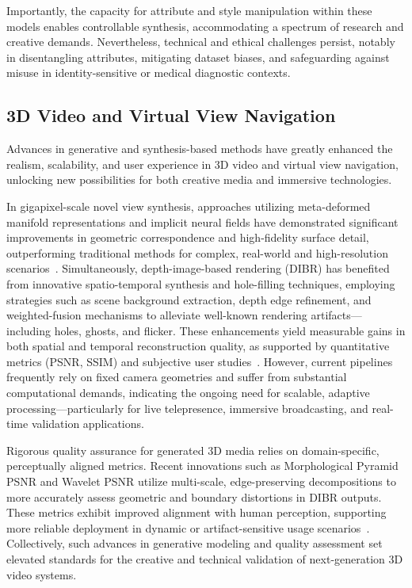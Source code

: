 \documentclass[sigconf]{acmart}
\begin{document}
Importantly, the capacity for attribute and style manipulation within these models enables controllable synthesis, accommodating a spectrum of research and creative demands. Nevertheless, technical and ethical challenges persist, notably in disentangling attributes, mitigating dataset biases, and safeguarding against misuse in identity-sensitive or medical diagnostic contexts.

\subsection{3D Video and Virtual View Navigation}

Advances in generative and synthesis-based methods have greatly enhanced the realism, scalability, and user experience in 3D video and virtual view navigation, unlocking new possibilities for both creative media and immersive technologies.

In gigapixel-scale novel view synthesis, approaches utilizing meta-deformed manifold representations and implicit neural fields have demonstrated significant improvements in geometric correspondence and high-fidelity surface detail, outperforming traditional methods for complex, real-world and high-resolution scenarios~\cite{ref98}. Simultaneously, depth-image-based rendering (DIBR) has benefited from innovative spatio-temporal synthesis and hole-filling techniques, employing strategies such as scene background extraction, depth edge refinement, and weighted-fusion mechanisms to alleviate well-known rendering artifacts—including holes, ghosts, and flicker. These enhancements yield measurable gains in both spatial and temporal reconstruction quality, as supported by quantitative metrics (PSNR, SSIM) and subjective user studies~\cite{ref99}. However, current pipelines frequently rely on fixed camera geometries and suffer from substantial computational demands, indicating the ongoing need for scalable, adaptive processing—particularly for live telepresence, immersive broadcasting, and real-time validation applications.

Rigorous quality assurance for generated 3D media relies on domain-specific, perceptually aligned metrics. Recent innovations such as Morphological Pyramid PSNR and Wavelet PSNR utilize multi-scale, edge-preserving decompositions to more accurately assess geometric and boundary distortions in DIBR outputs. These metrics exhibit improved alignment with human perception, supporting more reliable deployment in dynamic or artifact-sensitive usage scenarios~\cite{ref99}. Collectively, such advances in generative modeling and quality assessment set elevated standards for the creative and technical validation of next-generation 3D video systems.
\end{document}
